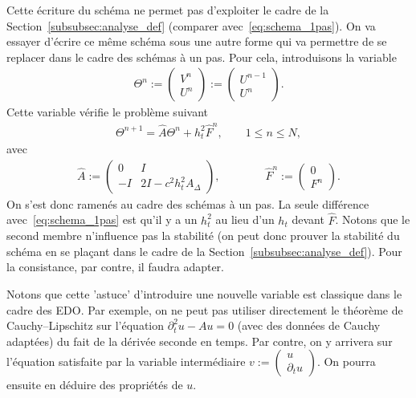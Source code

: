 \documentclass[12pt,a4paper,twoside]{article}
\begin{document}
Cette \'ecriture du sch\'ema ne permet pas d'exploiter
le cadre de la Section~\ref{subsubsec:analyse_def} (comparer avec~\eqref{eq:schema_1pas}).
On va essayer d'\'ecrire ce m\^eme sch\'ema sous une autre forme qui va permettre
de se replacer dans le cadre des sch\'emas \`a un pas.
Pour cela, introduisons la variable
\begin{align*}
  \Theta^n :=
  \begin{pmatrix}
    V^n \\ U^n
  \end{pmatrix}
  :=
  \begin{pmatrix}
    U^{n-1} \\ U^n
  \end{pmatrix} .
\end{align*}
Cette variable v\'erifie le probl\`eme suivant
\begin{align*}
  \Theta^{n+1} = \hat{A} \Theta^n + h_t^2 \hat{F}^n , \qquad 1 \leq n \leq N ,
\end{align*}
avec
\begin{align*}
  \hat{A} :=
  \begin{pmatrix}
    0
    & I
    \\
    - I
    & 2 I - c^2 h_t^2 A_{\Delta}
  \end{pmatrix} ,
  \qquad \qquad
  \hat{F}^n :=
  \begin{pmatrix}
    0 \\ F^n
  \end{pmatrix} .
\end{align*}
On s'est donc ramen\'es au cadre des sch\'emas \`a un pas.
La seule diff\'erence avec~\eqref{eq:schema_1pas}
est qu'il y a un $h_t^2$ au lieu d'un $h_t$ devant $\hat{F}$.
Notons que le second membre n'influence pas la stabilit\'e
(on peut donc prouver la stabilit\'e du sch\'ema en se pla\c{c}ant
dans le cadre de la Section~\ref{subsubsec:analyse_def}).
Pour la consistance, par contre, il faudra adapter.


\begin{remark}
  Notons que cette 'astuce' d'introduire une nouvelle variable est classique dans le cadre des EDO.
  Par exemple, on ne peut pas utiliser directement le th\'eor\`eme de Cauchy--Lipschitz
  sur l'\'equation $\partial_{t}^2 u - A u = 0$ (avec des donn\'ees de Cauchy adapt\'ees)
  du fait de la d\'eriv\'ee seconde en temps. Par contre, on y arrivera sur l'\'equation
  satisfaite par la variable
  interm\'ediaire $v := \begin{pmatrix} u \\ \partial_t u \end{pmatrix}$.
  On pourra ensuite en d\'eduire des propri\'et\'es de $u$.
\end{remark}
\end{document}
